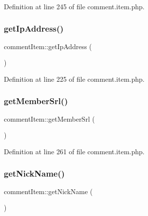 Definition at line 245 of file comment.\+item.\+php.

\hypertarget{classcommentItem_a487957e1ef240fd2ff03f122f7827347}{}\label{classcommentItem_a487957e1ef240fd2ff03f122f7827347} 
\subsubsection{\texorpdfstring{get\+Ip\+Address()}{getIpAddress()}}
{\footnotesize\ttfamily comment\+Item\+::get\+Ip\+Address (\begin{DoxyParamCaption}{ }\end{DoxyParamCaption})}



Definition at line 225 of file comment.\+item.\+php.

\hypertarget{classcommentItem_a6cf2c8baefdc9183f0194805bc197231}{}\label{classcommentItem_a6cf2c8baefdc9183f0194805bc197231} 
\subsubsection{\texorpdfstring{get\+Member\+Srl()}{getMemberSrl()}}
{\footnotesize\ttfamily comment\+Item\+::get\+Member\+Srl (\begin{DoxyParamCaption}{ }\end{DoxyParamCaption})}



Definition at line 261 of file comment.\+item.\+php.

\hypertarget{classcommentItem_a097673677cd1c461040cbc9275b7fca9}{}\label{classcommentItem_a097673677cd1c461040cbc9275b7fca9} 
\subsubsection{\texorpdfstring{get\+Nick\+Name()}{getNickName()}}
{\footnotesize\ttfamily comment\+Item\+::get\+Nick\+Name (\begin{DoxyParamCaption}{ }\end{DoxyParamCaption})}



